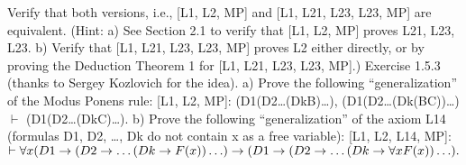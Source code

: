 Verify that both versions, i.e., [L1, L2, MP] and [L1, L21, L23, L23, MP] are equivalent. (Hint: a) See
Section 2.1 to verify that [L1, L2, MP] proves L21, L23, L23. b) Verify that [L1, L21, L23, L23, MP] proves
L2 either directly, or by proving the Deduction Theorem 1 for [L1, L21, L23, L23, MP].)
Exercise 1.5.3 (thanks to Sergey Kozlovich for the idea).
a) Prove the following ``generalization'' of the Modus Ponens rule:
[L1, L2, MP]: (D1\IMPLIES (D2\IMPLIES \ldots (Dk\IMPLIES B)\ldots ), (D1\IMPLIES (D2\IMPLIES \ldots (Dk\IMPLIES (B\IMPLIES C))\ldots ) \(\vdash\) (D1\IMPLIES (D2\IMPLIES \ldots (Dk\IMPLIES C)\ldots ).
b) Prove the following ``generalization'' of the axiom L14 (formulas D1, D2, \ldots , Dk do not contain x as a
free variable):
[L1, L2, L14, MP]: \(\vdash \forall x(D1\rightarrow (D2\rightarrow \ldots (Dk\rightarrow F(x))\ldots ) \rightarrow  (D1\rightarrow (D2\rightarrow \ldots (Dk\rightarrow \forall xF(x))\ldots ).\)

